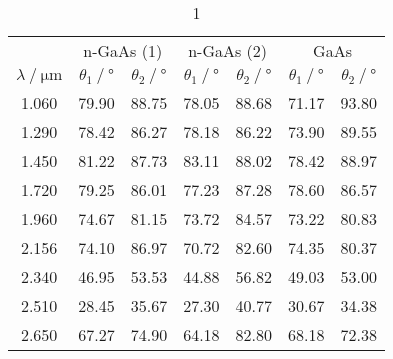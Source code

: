 \begin{table}
    \centering
    \caption{1}
    \begin{tabular}{c c c c c c c }
        \toprule
        & \multicolumn{2}{c}{n-GaAs (1)} & \multicolumn{2}{c}{n-GaAs (2)} & \multicolumn{2}{c}{GaAs} \\
		\cmidrule(lr){2-3}\cmidrule(lr){4-5}\cmidrule{6-7}
		{$\lambda \mathbin{/} \unit{\micro\meter}$} &
        {$\theta_1 \mathbin{/} \unit{\degree}$} & {$\theta_2 \mathbin{/} \unit{\degree}$} &
        {$\theta_1 \mathbin{/} \unit{\degree}$} & {$\theta_2 \mathbin{/} \unit{\degree}$} &
        {$\theta_1 \mathbin{/} \unit{\degree}$} & {$\theta_2 \mathbin{/} \unit{\degree}$} \\
		\midrule
        1.060& 79.90 & 88.75  & 78.05  &  88.68 & 71.17  &  93.80 \\
        1.290& 78.42 &  86.27 &  78.18 &  86.22 &  73.90 &  89.55 \\
        1.450& 81.22 &  87.73 &  83.11 &  88.02 &  78.42 &  88.97 \\
        1.720& 79.25 &  86.01 &  77.23 &  87.28 &  78.60 &  86.57 \\
        1.960& 74.67 &  81.15 &  73.72 &  84.57 &  73.22 &  80.83 \\
        2.156& 74.10 &  86.97 &  70.72 &  82.60 &  74.35 &  80.37 \\
        2.340& 46.95 &  53.53 &  44.88 &  56.82 &  49.03 &  53.00 \\
        2.510& 28.45 &  35.67 &  27.30 &  40.77 &  30.67 &  34.38 \\
        2.650& 67.27 &  74.90 &  64.18 &  82.80 &  68.18 &  72.38 \\
        \bottomrule
    \end{tabular}
    \label{tab:BFeld}
\end{table}

